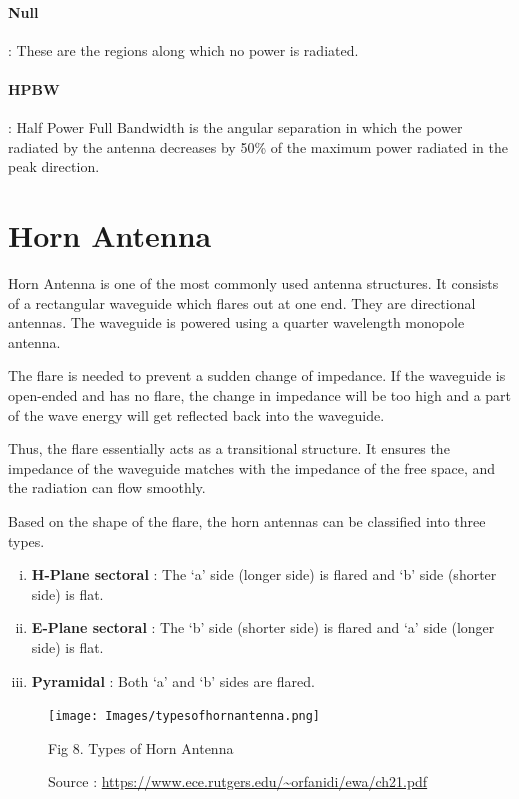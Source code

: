 \documentclass[12pt]{article}
\begin{document}
\paragraph{Null} : These are the regions along which no power is radiated. 
\paragraph{HPBW} : Half Power Full Bandwidth is the angular separation in which the power radiated by the antenna decreases by 50\% of the maximum power radiated in the peak direction.
\section{Horn Antenna}
Horn Antenna is one of the most commonly used antenna structures. It consists of a rectangular waveguide which flares out at one end. They are directional antennas. The waveguide is powered using a quarter wavelength monopole antenna. \linebreak

The flare is needed to prevent a sudden change of impedance. If the waveguide is open-ended and has no flare, the change in impedance will be too high and a part of the wave energy will get reflected back into the waveguide. \linebreak 

Thus, the flare essentially acts as a transitional structure. It ensures the impedance of the waveguide matches with the impedance of the free space, and the radiation can flow smoothly. \linebreak

Based on the shape of the flare, the horn antennas can be classified into three types.
\begin{enumerate}[i.)]
  \item \textbf{H-Plane sectoral} : The `a' side (longer side) is flared and `b' side (shorter side) is flat.
  \item \textbf{E-Plane sectoral} : The `b' side (shorter side) is flared and `a' side (longer side) is flat.
  \item \textbf{Pyramidal} : Both `a' and `b' sides are flared.
\end{enumerate}
\begin{figure}[H]
  \centering
  \texttt{[image: Images/typesofhornantenna.png]}
  \caption{Fig 8. Types of Horn Antenna}
  \caption{\tiny Source : \url{https://www.ece.rutgers.edu/~orfanidi/ewa/ch21.pdf}}
\end{figure}
\end{document}

